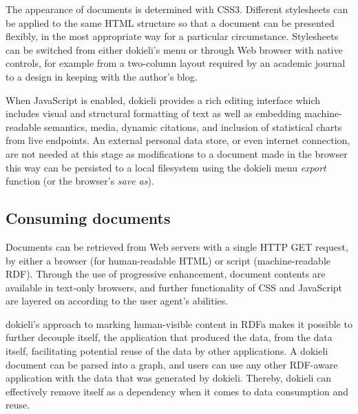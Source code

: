 \documentclass[a4paper]{llncs}
\begin{document}
                                    
\par The appearance of documents is determined with CSS3. Different stylesheets can be applied to the same HTML structure so that a document can be presented flexibly, in the most appropriate way for a particular circumstance. Stylesheets can be switched from either dokieli’s menu or through Web browser with native controls, for example from a two-column layout required by an academic journal to a design in keeping with the author’s blog.

                                    
\par When JavaScript is enabled, dokieli provides a rich editing interface which includes visual and structural formatting of text as well as embedding machine-readable semantics, media, dynamic citations, and inclusion of statistical charts from live endpoints. An external personal data store, or even internet connection, are not needed at this stage as modifications to a document made in the browser this way can be persisted to a local filesystem using the dokieli menu {\em export} function (or the browser’s {\em save as}).
                                
                            

                            
                                \subsection{Consuming documents}
  \label{consuming-documents}

                                
                                    
\par Documents can be retrieved from Web servers with a single HTTP GET request, by either a browser (for human-readable HTML) or script (machine-readable RDF). Through the use of progressive enhancement, document contents are available in text-only browsers, and further functionality of CSS and JavaScript are layered on according to the user agent’s abilities.

                                    
\par dokieli’s approach to marking human-visible content in RDFa makes it possible to further decouple itself, the application that produced the data, from the data itself, facilitating potential reuse of the data by other applications. A dokieli document can be parsed into a graph, and users can use any other RDF-aware application with the data that was generated by dokieli. Thereby, dokieli can effectively remove itself as a dependency when it comes to data consumption and reuse.
\end{document}

